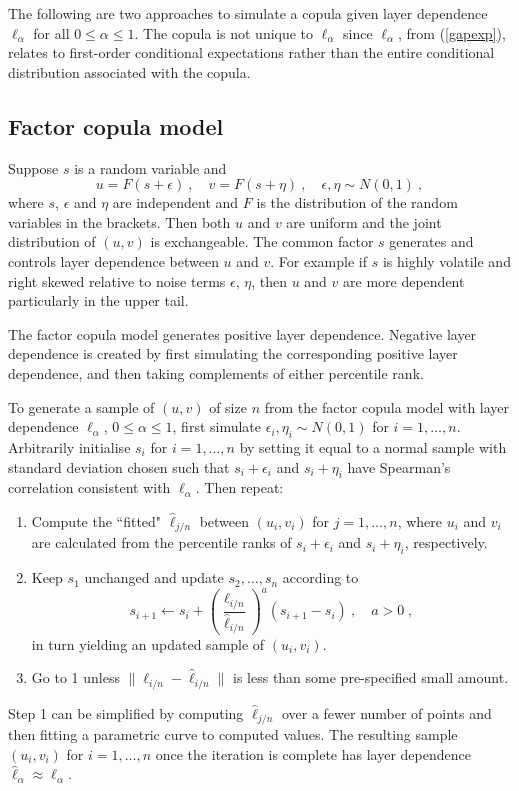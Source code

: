 \documentclass[authoryear]{elsarticle}
\newcommand{\eps}{\epsilon}
\newcommand{\cq}{\ ,\quad }
\newcommand{\eref}[1]{(\ref{#1})}
\begin{document}
The following are two approaches to simulate a copula given layer dependence $\ell_\alpha$ for all $0\leq\alpha\leq 1$. The copula is not unique to $\ell_\alpha$ since $\ell_\alpha$, from \eref{gapexp}, relates to first-order conditional expectations rather than the entire conditional distribution associated with the copula.


\subsection{Factor copula model}

Suppose $s$ is a random variable and
$$
u=F(s+\eps) \cq
v=F(s+\eta)    \cq \eps, \eta \sim N(0,1) \ ,
$$
where $s$, $\eps$ and $\eta$ are independent and $F$ is the  distribution of the random variables in the brackets. Then both $u$ and $v$ are uniform and the joint distribution of $(u,v)$ is exchangeable. The common factor $s$ generates and controls layer dependence between $u$ and $v$. For example if $s$ is highly volatile and right skewed relative to noise terms $\eps$, $\eta$, then $u$ and $v$ are more dependent particularly in the upper tail.

The factor copula model generates positive layer dependence. Negative layer dependence is created by first simulating the corresponding positive layer dependence, and then taking complements of either percentile rank.

To generate a sample of $(u,v)$ of size $n$ from the factor copula model with layer dependence $\ell_\alpha$, $0\le\alpha\le 1$,  first simulate $\eps_i,\eta_i\sim N(0,1)$ for $i=1,\ldots,n$.  Arbitrarily initialise $s_i$ for $i=1,\ldots,n$ by setting it equal to a normal sample with standard deviation chosen such that $s_i+\eps_{i}$ and $s_i+\eta_{i}$ have Spearman's correlation consistent with $\ell_\alpha$. Then repeat:
\begin{enumerate}

\item Compute the ``fitted"  $\hat\ell_{j/n}$ between  $(u_i,v_i)$ for $j=1,\ldots,n$, where $u_i$ and $v_i$ are calculated from the percentile ranks of $s_i+\eps_{i}$ and $s_i+\eta_{i}$, respectively.

\item Keep $s_1$ unchanged and update  $s_2,\ldots,s_n$ according to
$$
s_{i+1}  \leftarrow s_{i}+  \left(\frac{\ell_{i/n}}{\hat \ell_{i/n}}\right)^a(s_{i+1}-s_i)\cq a>0\;,
$$
in turn yielding an updated sample of $(u_i,v_i)$.

\item Go to 1 unless $\|\ell_{i/n} -  \hat\ell_{i/n} \|$ is less than some pre-specified small amount.

\end{enumerate}
Step 1 can be simplified by computing $\hat \ell_{j/n}$ over a fewer number of points and then fitting a parametric curve to computed values. The resulting sample $(u_i,v_i)$ for   $i=1,\ldots,n$ once the iteration is complete has  layer dependence $\hat\ell_\alpha\approx\ell_\alpha$.
\end{document}
